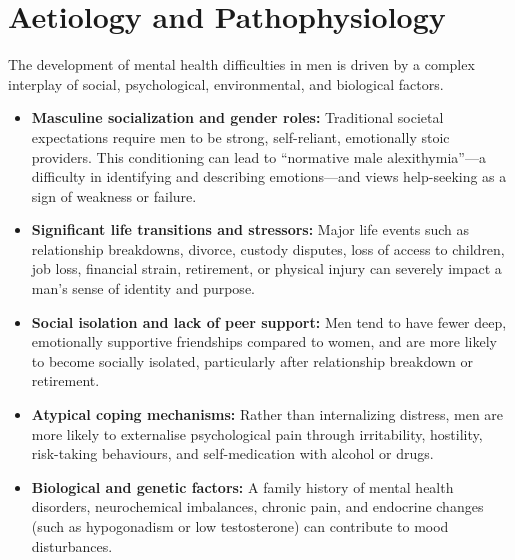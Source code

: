 \section*{Aetiology and Pathophysiology}
The development of mental health difficulties in men is driven by a complex interplay of social, psychological, environmental, and biological factors.
\begin{itemize}
    \item \textbf{Masculine socialization and gender roles:} Traditional societal expectations require men to be strong, self-reliant, emotionally stoic providers. This conditioning can lead to ``normative male alexithymia''—a difficulty in identifying and describing emotions—and views help-seeking as a sign of weakness or failure.
    \item \textbf{Significant life transitions and stressors:} Major life events such as relationship breakdowns, divorce, custody disputes, loss of access to children, job loss, financial strain, retirement, or physical injury can severely impact a man's sense of identity and purpose.
    \item \textbf{Social isolation and lack of peer support:} Men tend to have fewer deep, emotionally supportive friendships compared to women, and are more likely to become socially isolated, particularly after relationship breakdown or retirement.
    \item \textbf{Atypical coping mechanisms:} Rather than internalizing distress, men are more likely to externalise psychological pain through irritability, hostility, risk-taking behaviours, and self-medication with alcohol or drugs.
    \item \textbf{Biological and genetic factors:} A family history of mental health disorders, neurochemical imbalances, chronic pain, and endocrine changes (such as hypogonadism or low testosterone) can contribute to mood disturbances.
\end{itemize}

